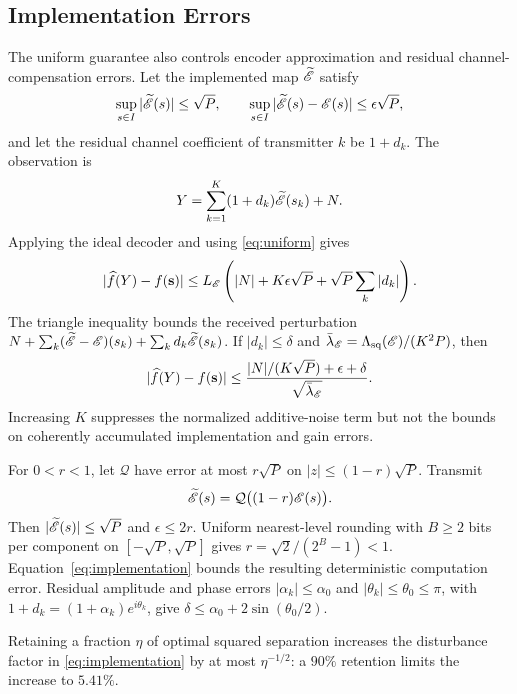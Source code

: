 \subsection{Implementation Errors}
\label{sec:implementation}
The uniform guarantee also controls encoder approximation and residual channel-compensation errors. Let the implemented map $\widetilde{\mathscr E}$ satisfy
$$
 \sup_{s\in I}|\widetilde{\mathscr E}(s)|\le\sqrt P,
 \qquad
 \sup_{s\in I}|\widetilde{\mathscr E}(s)-\mathscr E(s)|\le\epsilon\sqrt P,
$$
and let the residual channel coefficient of transmitter $k$ be $1+d_k$. The observation is
$$
 Y=\sum_{k=1}^K(1+d_k)\widetilde{\mathscr E}(s_k)+N.
$$
Applying the ideal decoder and using \eqref{eq:uniform} gives
\begin{equation}
 |\widehat f(Y)-f(\mathbf s)|
 \le L_\mathscr E\left(|N|+K\epsilon\sqrt P
       +\sqrt P\sum_k|d_k|\right).
 \label{eq:implementation}
\end{equation}
The triangle inequality bounds the received perturbation $N+\sum_k(\widetilde{\mathscr E}-\mathscr E)(s_k)+\sum_k d_k\widetilde{\mathscr E}(s_k)$. If $|d_k|\le\delta$ and $\bar\lambda_\mathscr E=\Lambda_{\mathrm{sq}}(\mathscr E)/(K^2P)$, then
$$
 |\widehat f(Y)-f(\mathbf s)|
 \le\frac{|N|/(K\sqrt P)+\epsilon+\delta}
 {\sqrt{\bar\lambda_\mathscr E}}.
$$
Increasing $K$ suppresses the normalized additive-noise term but not the bounds on coherently accumulated implementation and gain errors.

For $0<r<1$, let $\mathcal Q$ have error at most $r\sqrt P$ on $|z|\le(1-r)\sqrt P$. Transmit
$$
 \widetilde{\mathscr E}(s)=\mathcal Q\bigl((1-r)\mathscr E(s)\bigr).
$$
Then $|\widetilde{\mathscr E}(s)|\le\sqrt P$ and $\epsilon\le2r$. Uniform nearest-level rounding with $B\ge2$ bits per component on $[-\sqrt P,\sqrt P]$ gives $r=\sqrt2/(2^B-1)<1$. Equation~\eqref{eq:implementation} bounds the resulting deterministic computation error. Residual amplitude and phase errors $|\alpha_k|\le\alpha_0$ and $|\theta_k|\le\theta_0\le\pi$, with $1+d_k=(1+\alpha_k)e^{i\theta_k}$, give $\delta\le\alpha_0+2\sin(\theta_0/2)$.

Retaining a fraction $\eta$ of optimal squared separation increases the disturbance factor in \eqref{eq:implementation} by at most $\eta^{-1/2}$: a $90\%$ retention limits the increase to $5.41\%$.
